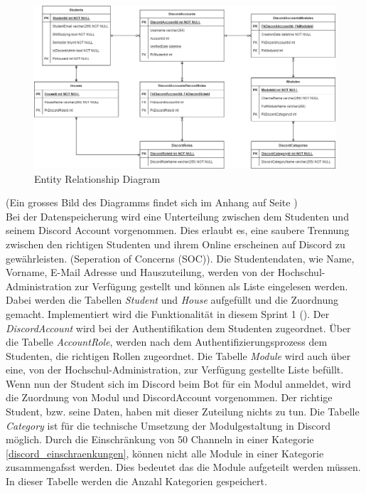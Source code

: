 \documentclass[a4paper, table]{article}
\begin{document}
\begin{figure}[h]
    \centering
    \includegraphics[width=1\textwidth]{img/ER-Diagramm.png}
    \caption{Entity Relationship Diagram}
    \label{fig:ER-Diagram}
\end{figure}

(Ein grosses Bild des Diagramms findet sich im Anhang auf Seite \pageref*{fig:ER-Diagram-big})\\
Bei der Datenspeicherung wird eine Unterteilung zwischen dem Studenten und seinem Discord Account vorgenommen.
Dies erlaubt es, eine saubere Trennung zwischen den richtigen Studenten und ihrem Online erscheinen auf Discord zu gewährleisten.
(Seperation of Concerns (SOC)).
Die Studentendaten, wie Name, Vorname, E-Mail Adresse und Hauszuteilung, werden von der Hochschul-Administration zur Verfügung gestellt und können als Liste eingelesen werden.
Dabei werden die Tabellen \textit{Student} und \textit{House} aufgefüllt und die Zuordnung gemacht.
Implementiert wird die Funktionalität in diesem Sprint 1 ().
\newline
Der \textit{DiscordAccount} wird bei der Authentifikation dem Studenten zugeordnet.
Über die Tabelle \textit{AccountRole}, werden nach dem Authentifizierungsprozess dem Studenten, die richtigen Rollen zugeordnet.
\newline
Die Tabelle \textit{Module} wird auch über eine, von der Hochschul-Administration, zur Verfügung gestellte Liste befüllt.
Wenn nun der Student sich im Discord beim Bot für ein Modul anmeldet, wird die Zuordnung von Modul und DiscordAccount vorgenommen.
Der richtige Student, bzw. seine Daten, haben mit dieser Zuteilung nichts zu tun.
\newline
Die Tabelle \textit{Category} ist für die technische Umsetzung der Modulgestaltung in Discord möglich.
Durch die Einschränkung von 50 Channeln in einer Kategorie \ref{discord_einschraenkungen}, können nicht alle Module in einer Kategorie zusammengafsst werden.
Dies bedeutet das die Module aufgeteilt werden müssen.
In dieser Tabelle werden die Anzahl Kategorien gespeichert.
\end{document}

